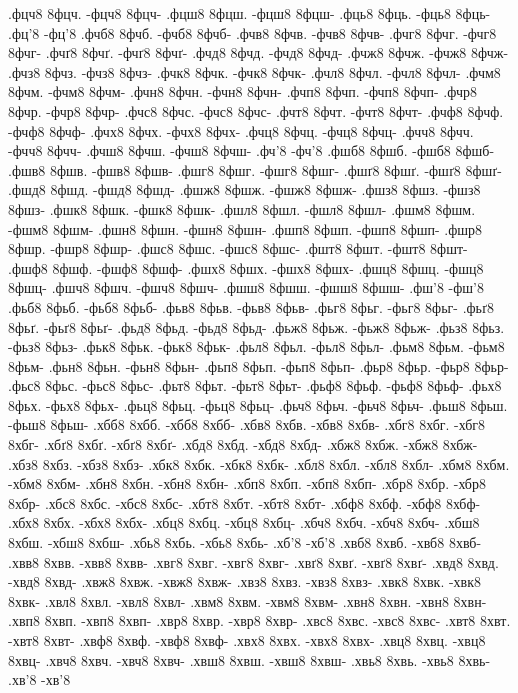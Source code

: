 {.фцч8 8фцч. -фцч8 8фцч-
.фцш8 8фцш. -фцш8 8фцш-
.фць8 8фць. -фць8 8фць-
.фц'8 -фц'8
.фчб8 8фчб. -фчб8 8фчб-
.фчв8 8фчв. -фчв8 8фчв-
.фчг8 8фчг. -фчг8 8фчг-
.фчґ8 8фчґ. -фчґ8 8фчґ-
.фчд8 8фчд. -фчд8 8фчд-
.фчж8 8фчж. -фчж8 8фчж-
.фчз8 8фчз. -фчз8 8фчз-
.фчк8 8фчк. -фчк8 8фчк-
.фчл8 8фчл. -фчл8 8фчл-
.фчм8 8фчм. -фчм8 8фчм-
.фчн8 8фчн. -фчн8 8фчн-
.фчп8 8фчп. -фчп8 8фчп-
.фчр8 8фчр. -фчр8 8фчр-
.фчс8 8фчс. -фчс8 8фчс-
.фчт8 8фчт. -фчт8 8фчт-
.фчф8 8фчф. -фчф8 8фчф-
.фчх8 8фчх. -фчх8 8фчх-
.фчц8 8фчц. -фчц8 8фчц-
.фчч8 8фчч. -фчч8 8фчч-
.фчш8 8фчш. -фчш8 8фчш-
.фч'8 -фч'8
.фшб8 8фшб. -фшб8 8фшб-
.фшв8 8фшв. -фшв8 8фшв-
.фшг8 8фшг. -фшг8 8фшг-
.фшґ8 8фшґ. -фшґ8 8фшґ-
.фшд8 8фшд. -фшд8 8фшд-
.фшж8 8фшж. -фшж8 8фшж-
.фшз8 8фшз. -фшз8 8фшз-
.фшк8 8фшк. -фшк8 8фшк-
.фшл8 8фшл. -фшл8 8фшл-
.фшм8 8фшм. -фшм8 8фшм-
.фшн8 8фшн. -фшн8 8фшн-
.фшп8 8фшп. -фшп8 8фшп-
.фшр8 8фшр. -фшр8 8фшр-
.фшс8 8фшс. -фшс8 8фшс-
.фшт8 8фшт. -фшт8 8фшт-
.фшф8 8фшф. -фшф8 8фшф-
.фшх8 8фшх. -фшх8 8фшх-
.фшц8 8фшц. -фшц8 8фшц-
.фшч8 8фшч. -фшч8 8фшч-
.фшш8 8фшш. -фшш8 8фшш-
.фш'8 -фш'8
.фьб8 8фьб. -фьб8 8фьб-
.фьв8 8фьв. -фьв8 8фьв-
.фьг8 8фьг. -фьг8 8фьг-
.фьґ8 8фьґ. -фьґ8 8фьґ-
.фьд8 8фьд. -фьд8 8фьд-
.фьж8 8фьж. -фьж8 8фьж-
.фьз8 8фьз. -фьз8 8фьз-
.фьк8 8фьк. -фьк8 8фьк-
.фьл8 8фьл. -фьл8 8фьл-
.фьм8 8фьм. -фьм8 8фьм-
.фьн8 8фьн. -фьн8 8фьн-
.фьп8 8фьп. -фьп8 8фьп-
.фьр8 8фьр. -фьр8 8фьр-
.фьс8 8фьс. -фьс8 8фьс-
.фьт8 8фьт. -фьт8 8фьт-
.фьф8 8фьф. -фьф8 8фьф-
.фьх8 8фьх. -фьх8 8фьх-
.фьц8 8фьц. -фьц8 8фьц-
.фьч8 8фьч. -фьч8 8фьч-
.фьш8 8фьш. -фьш8 8фьш-
.хбб8 8хбб. -хбб8 8хбб-
.хбв8 8хбв. -хбв8 8хбв-
.хбг8 8хбг. -хбг8 8хбг-
.хбґ8 8хбґ. -хбґ8 8хбґ-
.хбд8 8хбд. -хбд8 8хбд-
.хбж8 8хбж. -хбж8 8хбж-
.хбз8 8хбз. -хбз8 8хбз-
.хбк8 8хбк. -хбк8 8хбк-
.хбл8 8хбл. -хбл8 8хбл-
.хбм8 8хбм. -хбм8 8хбм-
.хбн8 8хбн. -хбн8 8хбн-
.хбп8 8хбп. -хбп8 8хбп-
.хбр8 8хбр. -хбр8 8хбр-
.хбс8 8хбс. -хбс8 8хбс-
.хбт8 8хбт. -хбт8 8хбт-
.хбф8 8хбф. -хбф8 8хбф-
.хбх8 8хбх. -хбх8 8хбх-
.хбц8 8хбц. -хбц8 8хбц-
.хбч8 8хбч. -хбч8 8хбч-
.хбш8 8хбш. -хбш8 8хбш-
.хбь8 8хбь. -хбь8 8хбь-
.хб'8 -хб'8
.хвб8 8хвб. -хвб8 8хвб-
.хвв8 8хвв. -хвв8 8хвв-
.хвг8 8хвг. -хвг8 8хвг-
.хвґ8 8хвґ. -хвґ8 8хвґ-
.хвд8 8хвд. -хвд8 8хвд-
.хвж8 8хвж. -хвж8 8хвж-
.хвз8 8хвз. -хвз8 8хвз-
.хвк8 8хвк. -хвк8 8хвк-
.хвл8 8хвл. -хвл8 8хвл-
.хвм8 8хвм. -хвм8 8хвм-
.хвн8 8хвн. -хвн8 8хвн-
.хвп8 8хвп. -хвп8 8хвп-
.хвр8 8хвр. -хвр8 8хвр-
.хвс8 8хвс. -хвс8 8хвс-
.хвт8 8хвт. -хвт8 8хвт-
.хвф8 8хвф. -хвф8 8хвф-
.хвх8 8хвх. -хвх8 8хвх-
.хвц8 8хвц. -хвц8 8хвц-
.хвч8 8хвч. -хвч8 8хвч-
.хвш8 8хвш. -хвш8 8хвш-
.хвь8 8хвь. -хвь8 8хвь-
.хв'8 -хв'8
}

